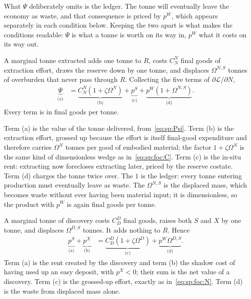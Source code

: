 What $\Psi$ deliberately omits is the ledger. The tonne will eventually leave the economy as waste, and that consequence is priced by $p^W$, which appears separately in each condition below. Keeping the two apart is what makes the conditions readable: $\Psi$ is what a tonne is worth on its way in, $p^W$ what it costs on its way out.

 A marginal tonne extracted adds one tonne to $R$, costs $C^N_N$ final goods of extraction effort, draws the reserve down by one tonne, and displaces $\Omega^{N,S}$ tonnes of overburden that never pass through $R$. Collecting the five terms of $\partial\mathcal L/\partial N$,
\begin{align}
\underbrace{\Psi}_{\text{(a)}} &= \underbrace{C^N_N\left(1+\zeta\Omega^N\right)}_{\text{(b)}}
+\underbrace{p^S}_{\text{(c)}}
+\underbrace{p^W\left(1+\Omega^{N,S}\right)}_{\text{(d)}} .
\label{eq:sp:foc:N}
\end{align}
Every term is in final goods per tonne.

Term (a) is the value of the tonne delivered, from~\eqref{eq:sp:Psi}. Term (b) is the extraction effort, grossed up because the effort is itself final-good expenditure and therefore carries $\Omega^N$ tonnes per good of embodied material; the factor $1+\zeta\Omega^N$ is the same kind of dimensionless wedge as in~\eqref{eq:sp:foc:C}. Term (c) is the in-situ rent: extracting now forecloses extracting later, priced by the reserve costate. Term (d) charges the tonne twice over. The $1$ is the ledger: every tonne entering production must eventually leave as waste. The $\Omega^{N,S}$ is the displaced mass, which becomes waste without ever having been material input; it is dimensionless, so the product with $p^W$ is again final goods per tonne.

 A marginal tonne of discovery costs $C^D_D$ final goods, raises both $S$ and $X$ by one tonne, and displaces $\Omega^{D,S}$ tonnes. It adds nothing to $R$. Hence
\begin{align}
\underbrace{p^S}_{\text{(a)}}+\underbrace{p^X}_{\text{(b)}} &= \underbrace{C^D_D\left(1+\zeta\Omega^D\right)}_{\text{(c)}}+\underbrace{p^W\Omega^{D,S}}_{\text{(d)}} .
\label{eq:sp:foc:D}
\end{align}
Term (a) is the rent created by the discovery and term (b) the shadow cost of having used up an easy deposit, with $p^X<0$; their sum is the net value of a discovery. Term (c) is the grossed-up effort, exactly as in~\eqref{eq:sp:foc:N}. Term (d) is the waste from displaced mass alone.

